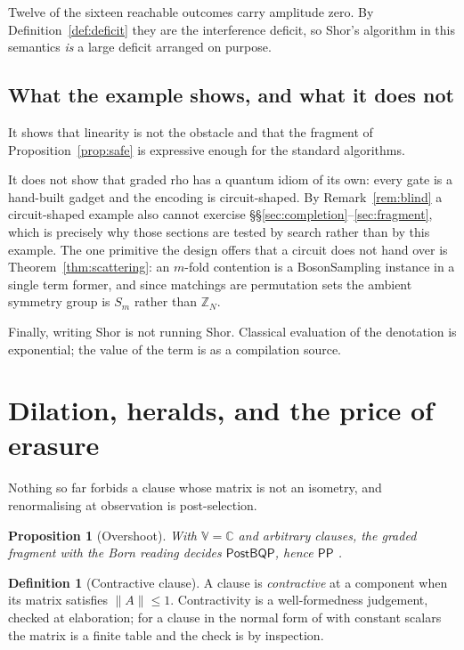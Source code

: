 \documentclass[11pt,a4paper]{article}
\theoremstyle{plain}
\newtheorem{proposition}[theorem]{Proposition}
\theoremstyle{definition}
\newtheorem{definition}[theorem]{Definition}
\theoremstyle{remark}
\newcommand{\V}{\mathbb{V}}
\newcommand{\Cx}{\mathbb{C}}
\begin{document}
Twelve of the sixteen reachable outcomes carry amplitude zero. By
Definition~\ref{def:deficit} they are the interference deficit, so Shor's
algorithm in this semantics \emph{is} a large deficit arranged on purpose.

\subsection{What the example shows, and what it does not}

It shows that linearity is not the obstacle and that the fragment of
Proposition~\ref{prop:safe} is expressive enough for the standard algorithms.

It does not show that graded rho has a quantum idiom of its own: every gate is a
hand-built gadget and the encoding is circuit-shaped. By
Remark~\ref{rem:blind} a circuit-shaped example also cannot exercise
\S\S\ref{sec:completion}--\ref{sec:fragment}, which is precisely why those
sections are tested by search rather than by this example. The one primitive the
design offers that a circuit does not hand over is
Theorem~\ref{thm:scattering}: an $m$-fold contention is a BosonSampling instance
\cite{AaronsonArkhipov} in a single term former, and since matchings are
permutation sets the ambient symmetry group is $S_m$ rather than $\mathbb{Z}_N$.

Finally, writing Shor is not running Shor. Classical evaluation of the
denotation is exponential; the value of the term is as a compilation source.

\section{Dilation, heralds, and the price of erasure}\label{sec:dilation}

Nothing so far forbids a clause whose matrix is not an isometry, and
renormalising at observation is post-selection.

\begin{proposition}[Overshoot]\label{prop:postbqp}
With $\V = \Cx$ and arbitrary clauses, the graded fragment with the Born reading
decides $\mathsf{PostBQP}$, hence $\mathsf{PP}$ \cite{Aaronson}.
\end{proposition}

\begin{definition}[Contractive clause]\label{def:contractive}
A clause is \emph{contractive} at a component when its matrix satisfies
$\|A\| \leq 1$. Contractivity is a well-formedness judgement, checked at
elaboration; for a clause in the normal form of \cite{ResAlg} with constant
scalars the matrix is a finite table and the check is by inspection.
\end{definition}
\end{document}
